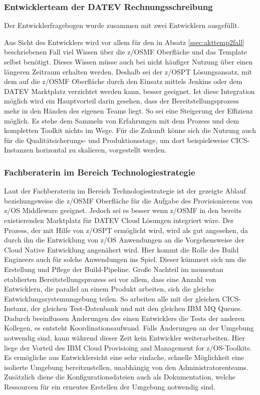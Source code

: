\subsubsection{Entwicklerteam der DATEV Rechnungsschreibung}
Der Entwicklerfragebogen wurde zusammen mit zwei Entwicklern ausgefüllt.

Aus Sicht des Entwicklers wird vor allem für den in Absatz \ref{ssec:akttemp2fall} beschriebenen Fall viel Wissen über die z/OSMF Oberfläche und das Template selbst benötigt.
Dieses Wissen müsse auch bei nicht häufiger Nutzung über einen längeren Zeitraum erhalten werden.
Deshalb sei der z/OSPT Lösungsansatz, mit dem auf die z/OSMF Oberfläche durch den Einsatz mittels Jenkins oder dem DATEV \glqq Marktplatz\grqq{} verzichtet werden kann, besser geeignet.
Ist diese Integration möglich wird ein Hauptvorteil darin gesehen, dass der Bereitstellungsprozess mehr in den Händen des eigenen Teams liegt.
So sei eine Steigerung der Effizienz möglich.
Es stehe dem Sammeln von Erfahrungen mit dem Prozess und dem kompletten Toolkit nichts im Wege.
Für die Zukunft könne sich die Nutzung auch für die Qualitätsicherungs- und Produktionsstage, um dort beispielsweise CICS-Instanzen horizontal zu skalieren, vorgestellt werden.

\subsubsection{Fachberaterin im Bereich Technologiestrategie}
Laut der Fachberaterin im Bereich Technologiestrategie ist der gezeigte Ablauf beziehungsweise die z/OSMF Oberfläche für die Aufgabe des Provisionierens von z/OS Middleware geeignet.
Jedoch sei es besser wenn z/OSMF in den bereits existierenden \glqq Marktplatz\grqq{} für DATEV Cloud Lösungen integriert wäre.
Der Prozess, der mit Hilfe von z/OSPT ermöglicht wird, wird als gut angesehen, da durch ihn die Entwicklung von z/OS Anwendungen an die Vorgehensweise der Cloud Native Entwicklung angenähert wird.
Hier kommt die Rolle des Build Engineers auch für solche Anwendungen ins Spiel.
Dieser kümmert sich um die Erstellung und Pflege der Build-Pipeline.
Große Nachteil im momentan etablierten Bereitstellungsprozess sei vor allem,  dass eine Anzahl von Entwicklern, die parallel an einem Produkt arbeiten, sich die gleiche Entwicklungssystemumgebung teilen.
So arbeiten alle mit der gleichen CICS-Instanz, der gleichen Test-Datenbank und mit den gleichen IBM MQ Queues.
Dadurch beeinflussen Änderungen des einen Entwicklers die Tests der anderen Kollegen, es entsteht Koordinationsaufwand.
Falls Änderungen an der Umgebung notwendig sind, kann während dieser Zeit kein Entwickler weiterarbeiten.
Hier liege der Vorteil des \glqq IBM Cloud Provisioing and Management for z/OS\grqq-Toolkits.
Es ermögliche aus Entwicklersicht eine sehr einfache, schnelle Möglichkeit eine isolierte Umgebung bereitzustellen, unabhängig von den Administratorenteams.
Zusätzlich diene die Konfigurationsdateien auch als Dokumentation, welche Ressourcen für ein erneutes Erstellen der Umgebung notwendig sind.

